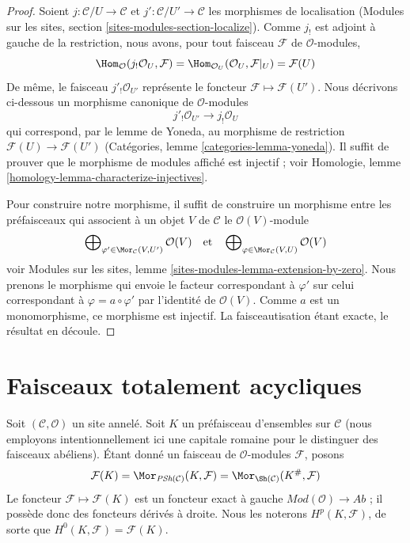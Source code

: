 \begin{proof}
Soient $j : \mathcal{C}/U \to \mathcal{C}$ et
$j' : \mathcal{C}/U' \to \mathcal{C}$ les morphismes de localisation
(Modules sur les sites, section \ref{sites-modules-section-localize}).
Comme $j_!$ est adjoint à gauche de la restriction, nous avons, pour tout
faisceau $\mathcal{F}$ de $\mathcal{O}$-modules,
$$
\Hom_\mathcal{O}(j_!\mathcal{O}_U, \mathcal{F})
=
\Hom_{\mathcal{O}_U}(\mathcal{O}_U, \mathcal{F}|_U)
=
\mathcal{F}(U)
$$
De même, le faisceau $j'_!\mathcal{O}_{U'}$ représente le foncteur
$\mathcal{F} \mapsto \mathcal{F}(U')$.
Nous décrivons ci-dessous un morphisme canonique de $\mathcal{O}$-modules
$$
j'_!\mathcal{O}_{U'} \longrightarrow j_!\mathcal{O}_U
$$
qui correspond, par le lemme de Yoneda, au morphisme de restriction
$\mathcal{F}(U) \to \mathcal{F}(U')$ (Catégories,
lemme \ref{categories-lemma-yoneda}).
Il suffit de prouver que le morphisme de modules affiché est injectif ; voir
Homologie, lemme \ref{homology-lemma-characterize-injectives}.

\medskip\noindent
Pour construire notre morphisme, il suffit de construire un morphisme entre
les préfaisceaux qui associent à un objet $V$ de $\mathcal{C}$ le
$\mathcal{O}(V)$-module
$$
\bigoplus\nolimits_{\varphi' \in \Mor_\mathcal{C}(V, U')} \mathcal{O}(V)
\quad\text{et}\quad
\bigoplus\nolimits_{\varphi \in \Mor_\mathcal{C}(V, U)} \mathcal{O}(V)
$$
voir Modules sur les sites,
lemme \ref{sites-modules-lemma-extension-by-zero}.
Nous prenons le morphisme qui envoie le facteur correspondant à $\varphi'$
sur celui correspondant à $\varphi = a \circ \varphi'$ par l'identité de
$\mathcal{O}(V)$. Comme $a$ est un monomorphisme, ce morphisme est injectif.
La faisceautisation étant exacte, le résultat en découle.
\end{proof}






\section{Faisceaux totalement acycliques}
\label{section-limp}

\noindent
Soit $(\mathcal{C}, \mathcal{O})$ un site annelé.
Soit $K$ un préfaisceau d'ensembles sur $\mathcal{C}$ (nous employons
intentionnellement ici une capitale romaine pour le distinguer des faisceaux
abéliens). Étant donné un faisceau de $\mathcal{O}$-modules $\mathcal{F}$,
posons
$$
\mathcal{F}(K) =
\Mor_{\textit{PSh}(\mathcal{C})}(K, \mathcal{F}) =
\Mor_{\Sh(\mathcal{C})}(K^\#, \mathcal{F})
$$
Le foncteur $\mathcal{F} \mapsto \mathcal{F}(K)$ est un foncteur exact à
gauche $\textit{Mod}(\mathcal{O}) \to \textit{Ab}$ ; il possède donc des
foncteurs dérivés à droite. Nous les noterons $H^p(K, \mathcal{F})$, de sorte
que $H^0(K, \mathcal{F}) = \mathcal{F}(K)$.

